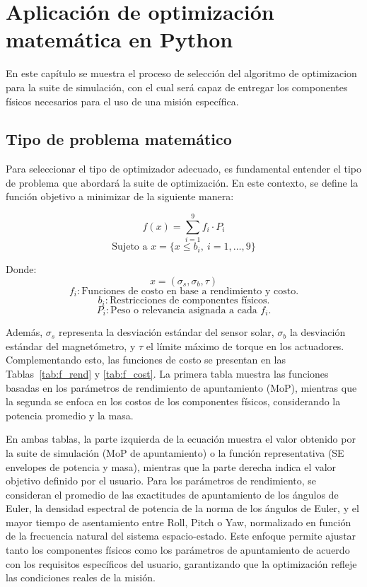 \section{Aplicación de optimización matemática en Python}

En este capítulo se muestra el proceso de selección del algoritmo de optimizacion para la suite de simulación, con el cual será capaz de entregar los componentes físicos necesarios para el uso de una misión específica.

\subsection{Tipo de problema matemático}

Para seleccionar el tipo de optimizador adecuado, es fundamental entender el tipo de problema que abordará la suite de optimización. En este contexto, se define la función objetivo a minimizar de la siguiente manera:


\[
f(x) = \sum_{i=1}^{9} f_i \cdot P_i
\]
\[
\text{Sujeto a } x = \{ x \leq b_i, \ i=1, \dots, 9 \}
\]

Donde:
\[
x = (\sigma_s, \sigma_b, \tau)
\]
\[
f_i:  \text{Funciones de costo en base a rendimiento y costo.}
\]
\[
b_i: \text{Restricciones de componentes físicos.}
\]
\[
P_i: \text{Peso o relevancia asignada a cada $f_i$.}
\]

Además, $\sigma_s$ representa la desviación estándar del sensor solar, $\sigma_b$ la desviación estándar del magnetómetro, y $\tau$ el límite máximo de torque en los actuadores. Complementando esto, las funciones de costo se presentan en las Tablas~\ref{tab:f_rend} y \ref{tab:f_cost}. La primera tabla muestra las funciones basadas en los parámetros de rendimiento de apuntamiento (MoP), mientras que la segunda se enfoca en los costos de los componentes físicos, considerando la potencia promedio y la masa. 

En ambas tablas, la parte izquierda de la ecuación muestra el valor obtenido por la suite de simulación (MoP de apuntamiento) o la función representativa (SE envelopes de potencia y masa), mientras que la parte derecha indica el valor objetivo definido por el usuario. Para los parámetros de rendimiento, se consideran el promedio de las exactitudes de apuntamiento de los ángulos de Euler, la densidad espectral de potencia de la norma de los ángulos de Euler, y el mayor tiempo de asentamiento entre Roll, Pitch o Yaw, normalizado en función de la frecuencia natural del sistema espacio-estado. Este enfoque permite ajustar tanto los componentes físicos como los parámetros de apuntamiento de acuerdo con los requisitos específicos del usuario, garantizando que la optimización refleje las condiciones reales de la misión.

